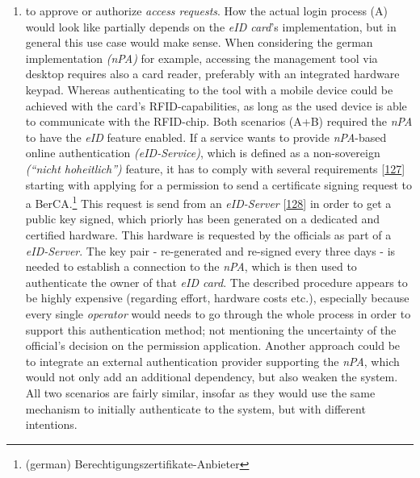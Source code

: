 \documentclass[12pt,english,a4paper,titlepage,cleardoublepage=empty,dottedtoc]{report}
\providecommand{\tightlist}{%
  \setlength{\itemsep}{0pt}\setlength{\parskip}{0pt}}
\begin{document}
\begin{enumerate}
\def\labelenumi{(\Alph{enumi})}
\setcounter{enumi}{1}
\tightlist
\item
  to approve or authorize \emph{access requests}. How the actual login
  process (A) would look like partially depends on the \emph{eID card}'s
  implementation, but in general this use case would make sense. When
  considering the german implementation \emph{(nPA)} for example,
  accessing the management tool via desktop requires also a card reader,
  preferably with an integrated hardware keypad. Whereas authenticating
  to the tool with a mobile device could be achieved with the card's
  RFID-capabilities, as long as the used device is able to communicate
  with the RFID-chip. Both scenarios (A+B) required the \emph{nPA} to
  have the \emph{eID} feature enabled. If a service wants to provide
  \emph{nPA}-based online authentication \emph{(eID-Service)}, which is
  defined as a non-sovereign \emph{(``nicht hoheitlich'')} feature, it
  has to comply with several requirements
  {[}\protect\hyperlink{ref-web_bsi-spec_eid}{127}{]} starting with
  applying for a permission to send a certificate signing request to a
  BerCA.\footnote{(german) Berechtigungszertifikate-Anbieter} This
  request is send from an \emph{eID-Server}
  {[}\protect\hyperlink{ref-web_2017_npa-eid-server}{128}{]} in order to
  get a public key signed, which priorly has been generated on a
  dedicated and certified hardware. This hardware is requested by the
  officials as part of a \emph{eID-Server}. The key pair - re-generated
  and re-signed every three days - is needed to establish a connection
  to the \emph{nPA}, which is then used to authenticate the owner of
  that \emph{eID card}. The described procedure appears to be highly
  expensive (regarding effort, hardware costs etc.), especially because
  every single \emph{operator} would needs to go through the whole
  process in order to support this authentication method; not mentioning
  the uncertainty of the official's decision on the permission
  application. Another approach could be to integrate an external
  authentication provider supporting the \emph{nPA}, which would not
  only add an additional dependency, but also weaken the system. All two
  scenarios are fairly similar, insofar as they would use the same
  mechanism to initially authenticate to the system, but with different
  intentions.
\end{enumerate}
\end{document}
